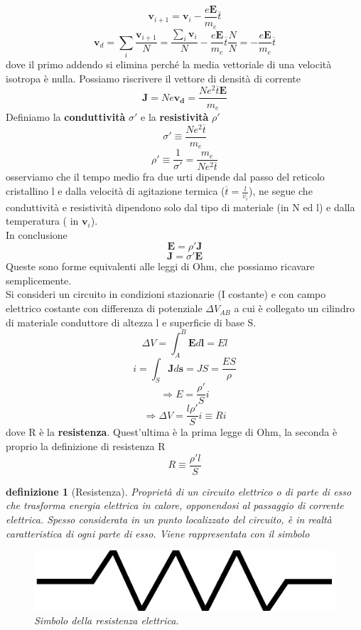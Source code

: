 \documentclass[10pt,a4paper]{article}
\newtheorem{definizione}{definizione}
\begin{document}
\[\mathbf{v}_{i+1}  = \mathbf{v}_i - \frac{e\mathbf{E}}{m_e}\overline{t}\]
\[\mathbf{v}_d = \sum_i\frac{\mathbf{v}_{i+1}}{N}= \frac{\sum_i\mathbf{v}_i}{N} - \frac{e\mathbf{E}}{m_e}\overline{t} \frac{N}{N} = - \frac{e\mathbf{E}}{m_e}\overline{t}\]
dove il primo addendo si elimina perché la media vettoriale di una velocità isotropa è nulla. Possiamo riscrivere il vettore di densità di corrente
\[\mathbf{J}= Ne\mathbf{v_d}= \frac{Ne^2\overline{t}\mathbf{E}}{m_e}\]
Definiamo la \textbf{conduttività} $\sigma'$ e la \textbf{resistività} $\rho'$
\[\sigma' \equiv \frac{Ne^2\overline{t}}{m_e}\]
\[\rho' \equiv \frac{1}{\sigma'}= \frac{m_e}{Ne^2\overline{t}}\]
osserviamo che il tempo medio fra due urti dipende dal passo del reticolo cristallino l e dalla velocità di agitazione termica (\(\overline{t}= \frac{l}{v_i}\)), ne segue che conduttività e resistività dipendono solo dal tipo di materiale (in N ed l) e dalla temperatura ( in $\mathbf{v}_i$). \\
In conclusione
\[\mathbf{E}= \rho' \mathbf{J}\]
\[\mathbf{J}= \sigma' \mathbf{E}\]
Queste sono forme equivalenti alle leggi di Ohm, che possiamo ricavare semplicemente.\\
Si consideri un circuito in condizioni stazionarie (I costante) e con campo elettrico costante con differenza di potenziale \(\Delta V_{AB}\) a cui è collegato un cilindro di materiale conduttore di altezza l e superficie di base S. 
\[\Delta V = \int_{A}^{B}\mathbf{E}d\mathbf{l}=El\]
\[i = \int_S \mathbf{J}d\mathbf{s}= JS= \frac{E S}{\rho}\]
\[\Rightarrow E = \frac{\rho'}{S}i\]
\[\Rightarrow \Delta V = \frac{l\rho'}{S}i \equiv R i\]
dove R è la \textbf{resistenza}. Quest'ultima è la prima legge di Ohm, la seconda è proprio la definizione di resistenza R
\[R \equiv \frac{\rho' l}{S}\]
\begin{definizione}[Resistenza]
Proprietà di un circuito elettrico o di parte di esso che trasforma energia elettrica in calore, opponendosi al passaggio di corrente elettrica. Spesso considerata in un punto localizzato del circuito, è in realtà caratteristica di ogni parte di esso. Viene rappresentata con il simbolo
\begin{figure}[h!]
	\centering
	\includegraphics[width=0.3\linewidth]{images/resistenza}
	\caption{Simbolo della resistenza elettrica.}
	\label{fig:resistenza}
\end{figure}
\FloatBarrier
\end{definizione}
\end{document}
